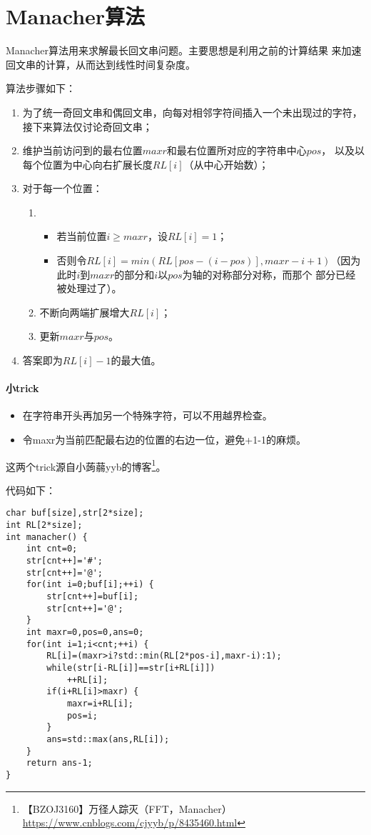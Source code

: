 \section{Manacher算法}
Manacher算法用来求解最长回文串问题。主要思想是利用之前的计算结果
来加速回文串的计算，从而达到线性时间复杂度。

算法步骤如下：
\begin{enumerate}
    \item 为了统一奇回文串和偶回文串，向每对相邻字符间插入一个未出现过的字符，
    接下来算法仅讨论奇回文串；
    \item 维护当前访问到的最右位置$maxr$和最右位置所对应的字符串中心$pos$，
    以及以每个位置为中心向右扩展长度$RL[i]$（从中心开始数）；
    \item 对于每一个位置：
    \begin{enumerate}
        \item
        \begin{itemize}
            \item 若当前位置$i\geq maxr$，设$RL[i]=1$；
            \item 否则令$RL[i]=min(RL[pos-(i-pos)],maxr-i+1)$（因为
            此时$i$到$maxr$的部分和$i$以$pos$为轴的对称部分对称，而那个
            部分已经被处理过了）。
        \end{itemize}
        \item 不断向两端扩展增大$RL[i]$；
        \item 更新$maxr$与$pos$。
    \end{enumerate}
    \item 答案即为$RL[i]-1$的最大值。
\end{enumerate}

\paragraph{小trick}
\begin{itemize}
    \item 在字符串开头再加另一个特殊字符，可以不用越界检查。
    \item 令maxr为当前匹配最右边的位置的右边一位，避免+1-1的麻烦。
\end{itemize}

这两个trick源自小蒟蒻yyb的博客\footnote{
    【BZOJ3160】万径人踪灭（FFT，Manacher）
    \url{https://www.cnblogs.com/cjyyb/p/8435460.html}
}。

代码如下：
\begin{lstlisting}
char buf[size],str[2*size];
int RL[2*size];
int manacher() {
    int cnt=0;
    str[cnt++]='#';
    str[cnt++]='@';
    for(int i=0;buf[i];++i) {
        str[cnt++]=buf[i];
        str[cnt++]='@';
    }
    int maxr=0,pos=0,ans=0;
    for(int i=1;i<cnt;++i) {
        RL[i]=(maxr>i?std::min(RL[2*pos-i],maxr-i):1);
        while(str[i-RL[i]]==str[i+RL[i]])
            ++RL[i];
        if(i+RL[i]>maxr) {
            maxr=i+RL[i];
            pos=i;
        }
        ans=std::max(ans,RL[i]);
    }
    return ans-1;
}
\end{lstlisting}
